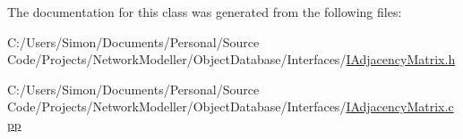 The documentation for this class was generated from the following files\+:\begin{DoxyCompactItemize}
\item 
C\+:/\+Users/\+Simon/\+Documents/\+Personal/\+Source Code/\+Projects/\+Network\+Modeller/\+Object\+Database/\+Interfaces/\hyperlink{_i_adjacency_matrix_8h}{I\+Adjacency\+Matrix.\+h}\item 
C\+:/\+Users/\+Simon/\+Documents/\+Personal/\+Source Code/\+Projects/\+Network\+Modeller/\+Object\+Database/\+Interfaces/\hyperlink{_i_adjacency_matrix_8cpp}{I\+Adjacency\+Matrix.\+cpp}\end{DoxyCompactItemize}
